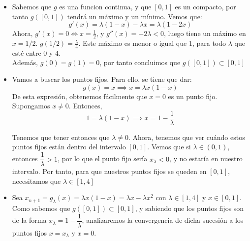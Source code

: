 \documentclass[11pt]{article}
\begin{document}
\begin{itemize}
	\item Sabemos que $g$ es una funcion continua, y que $[0,1]$ es un compacto, por tanto $g([0,1])$ tendrá un máximo y un mínimo. Vemos que:
	\[
	g'(x) = \lambda(1-x) - \lambda x  = \lambda(1-2x)
	\]
	Ahora, $g'(x) = 0 \iff x = \frac{1}{2}$, y $g''(x) = -2 \lambda < 0$, luego tiene un máximo en $x=1/2$. $g(1/2) = \frac{\lambda}{4}$. Este máximo es menor o igual que $1$, para todo $\lambda$ que esté entre 0 y 4.\\
	Además, $g(0) = g(1) = 0$, por tanto concluimos que $g([0,1]) \subset [0,1]$
	
	\item Vamos a buscar los puntos fijos. Para ello, se tiene que dar:
	\[
	g(x) = x \implies x = \lambda x(1-x)
	\]
	De esta expresión, obtenemos fácilmente que $x=0$ es un punto fijo. Supongamos $x\ne0$. Entonces,
	\[
	1 = \lambda(1-x) \implies x = 1- \dfrac{1}{\lambda}
	\]
	
	Tenemos que tener entonces que $\lambda \ne 0$. Ahora, tenemos que ver cuándo estos puntos fijos están dentro del intervalo $[0,1]$. Vemos que si $\lambda \in (0,1)$, entonces $\dfrac{1}{\lambda}>1$, por lo que el punto fijo sería $x_\lambda < 0$, y no estaría en nuestro intervalo. Por tanto, para que nuestros puntos fijos se queden en $[0,1]$, necesitamos que $\lambda \in [1,4]$
	
	\item Sea $x_{n+1} = g_\lambda(x) = \lambda x(1-x) = \lambda x - \lambda x^2$ con $\lambda \in [1,4]$ y $x \in [0,1]$. Como sabemos que $g([0,1]) \subset [0,1]$, y sabiendo que los puntos fijos son de la forma $x_\lambda = 1 - \dfrac{1}{\lambda}$, analizaremos la convergencia de dicha sucesión a los puntos fijos $x=x_\lambda$ y $x=0$.

\begin{comment}	
	Vamos a usar el siguiente resultado:

	Sea $[a,b] \subseteq \mathbb R$ un intervalo cerrado y $g:[a,b] \to \mathbb R$ tal que:
	\begin{enumerate}
	\item $g_\lambda(x) \in [a,b] \ \ \ \forall x \in [a,b]$
	\item $g_\lambda$ es lipschitziana con constante de Lipschitz $L<1$, entonces $\exists ! x_\lambda \in [a,b]$ tal que $g(x_\lambda) = x_\lambda$ y $x_\lambda ^* = \lim_{n \to \infty} \{x_{n+1}\} \ \ \forall x_0 \in [a,b]$
\end{enumerate}


\end{comment}
\end{itemize}
\end{document}
